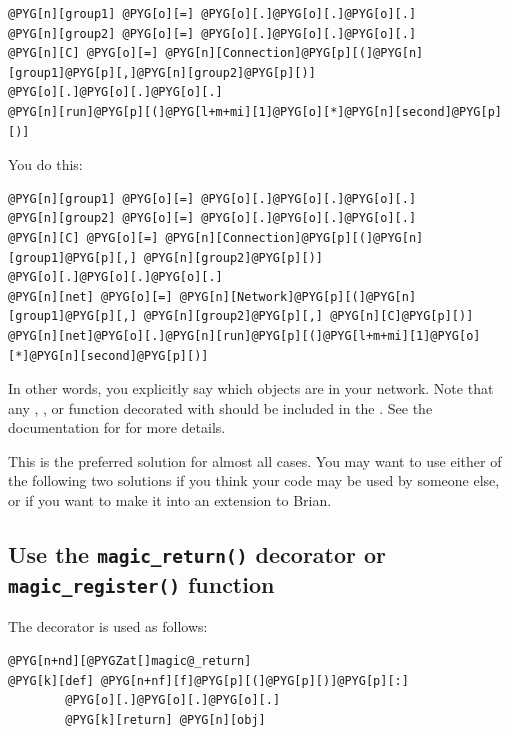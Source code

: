 \documentclass[letterpaper,10pt,english]{manual}
\begin{document}
\begin{Verbatim}[commandchars=@\[\]]
@PYG[n][group1] @PYG[o][=] @PYG[o][.]@PYG[o][.]@PYG[o][.]
@PYG[n][group2] @PYG[o][=] @PYG[o][.]@PYG[o][.]@PYG[o][.]
@PYG[n][C] @PYG[o][=] @PYG[n][Connection]@PYG[p][(]@PYG[n][group1]@PYG[p][,]@PYG[n][group2]@PYG[p][)]
@PYG[o][.]@PYG[o][.]@PYG[o][.]
@PYG[n][run]@PYG[p][(]@PYG[l+m+mi][1]@PYG[o][*]@PYG[n][second]@PYG[p][)]
\end{Verbatim}

You do this:

\begin{Verbatim}[commandchars=@\[\]]
@PYG[n][group1] @PYG[o][=] @PYG[o][.]@PYG[o][.]@PYG[o][.]
@PYG[n][group2] @PYG[o][=] @PYG[o][.]@PYG[o][.]@PYG[o][.]
@PYG[n][C] @PYG[o][=] @PYG[n][Connection]@PYG[p][(]@PYG[n][group1]@PYG[p][,] @PYG[n][group2]@PYG[p][)]
@PYG[o][.]@PYG[o][.]@PYG[o][.]
@PYG[n][net] @PYG[o][=] @PYG[n][Network]@PYG[p][(]@PYG[n][group1]@PYG[p][,] @PYG[n][group2]@PYG[p][,] @PYG[n][C]@PYG[p][)]
@PYG[n][net]@PYG[o][.]@PYG[n][run]@PYG[p][(]@PYG[l+m+mi][1]@PYG[o][*]@PYG[n][second]@PYG[p][)]
\end{Verbatim}

In other words, you explicitly say which objects are in your network.
Note that any \hyperlink{brian.NeuronGroup}{}, \hyperlink{brian.Connection}{},  or
function decorated with \hyperlink{brian.network_operation}{} should be included in the
\hyperlink{brian.Network}{}. See the documentation for \hyperlink{brian.Network}{} for more details.

This is the preferred solution for almost all cases. You may want to use either
of the following two solutions if you think your code may be used by someone
else, or if you want to make it into an extension to Brian.

\subsection{Use the \texttt{magic\_return()} decorator or \texttt{magic\_register()} function}

The \hyperlink{brian.magic_return}{} decorator is used as follows:

\begin{Verbatim}[commandchars=@\[\]]
@PYG[n+nd][@PYGZat[]magic@_return]
@PYG[k][def] @PYG[n+nf][f]@PYG[p][(]@PYG[p][)]@PYG[p][:]
        @PYG[o][.]@PYG[o][.]@PYG[o][.]
        @PYG[k][return] @PYG[n][obj]
\end{Verbatim}
\end{document}
